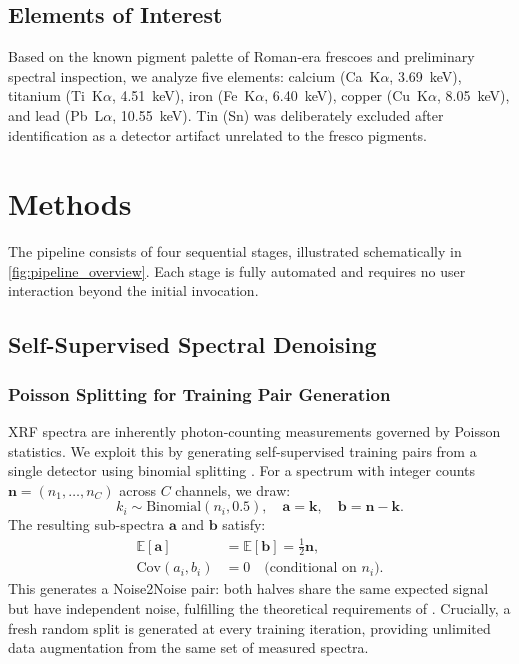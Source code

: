 \documentclass[twocolumn,11pt]{article}
\begin{document}
\subsection{Elements of Interest}

Based on the known pigment palette of Roman-era frescoes and preliminary
spectral inspection, we analyze five elements: calcium (Ca~K$\alpha$,
\SI{3.69}{\kilo\electronvolt}), titanium (Ti~K$\alpha$,
\SI{4.51}{\kilo\electronvolt}), iron (Fe~K$\alpha$,
\SI{6.40}{\kilo\electronvolt}), copper (Cu~K$\alpha$,
\SI{8.05}{\kilo\electronvolt}), and lead (Pb~L$\alpha$,
\SI{10.55}{\kilo\electronvolt}). Tin (Sn) was deliberately excluded after
identification as a detector artifact unrelated to the fresco pigments.


\section{Methods}
\label{sec:methods}

The pipeline consists of four sequential stages, illustrated schematically
in \cref{fig:pipeline_overview}. Each stage is fully automated and requires
no user interaction beyond the initial invocation.

\subsection{Self-Supervised Spectral Denoising}
\label{sec:denoising}

\subsubsection{Poisson Splitting for Training Pair Generation}

XRF spectra are inherently photon-counting measurements governed by Poisson
statistics. We exploit this by generating self-supervised training pairs from
a single detector using binomial splitting \citep{batson2019noise2self}. For
a spectrum with integer counts $\mathbf{n} = (n_1, \ldots, n_C)$ across $C$
channels, we draw:
\begin{equation}
  k_i \sim \text{Binomial}(n_i, 0.5), \quad
  \mathbf{a} = \mathbf{k}, \quad
  \mathbf{b} = \mathbf{n} - \mathbf{k}.
  \label{eq:poisson_split}
\end{equation}
The resulting sub-spectra $\mathbf{a}$ and $\mathbf{b}$ satisfy:
\begin{align}
  \mathbb{E}[\mathbf{a}] &= \mathbb{E}[\mathbf{b}] = \tfrac{1}{2}\mathbf{n}, \\
  \text{Cov}(a_i, b_i) &= 0 \quad \text{(conditional on } n_i\text{)}.
\end{align}
This generates a Noise2Noise pair: both halves share the same expected signal
but have independent noise, fulfilling the theoretical requirements of
\citet{lehtinen2018noise2noise}. Crucially, a fresh random split is generated
at every training iteration, providing unlimited data augmentation from the
same set of measured spectra.
\end{document}
